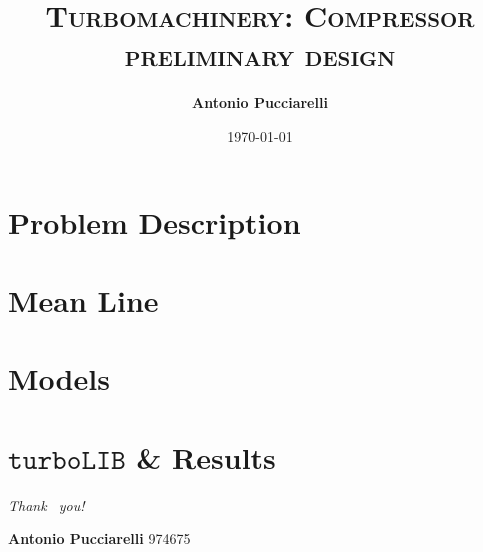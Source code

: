 \documentclass{beamer}
\author{\textbf{Antonio Pucciarelli}}
\title{\textsc{Turbomachinery: Compressor preliminary design}}
\institute{Politecnico di Milano}
\date{\today}
\begin{document}
	\begin{frame}
    		\titlepage
    	\end{frame}

	\section{Problem Description}
        
        
	\section{Mean Line}
        
    
   	\section{Models}
        
	
	\section{$\mathtt{turboLIB}$ \& Results}
	

	    
	\begin{frame}[allowframebreaks]
		\printbibliography
	\end{frame}

	\begin{frame}
		\begin{center}
			{\Huge \emph {\textrm{Thank  ~you!}}}
		\end{center}
		
		\vspace{2cm}
		
		\Large{\textbf{Antonio Pucciarelli}        \hfill 974675} \\ 
        
	\end{frame}
\end{document}
